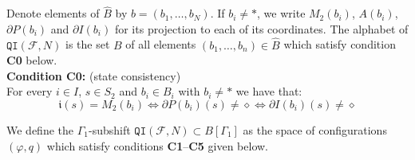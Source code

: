 \documentclass{article}
\theoremstyle{definition}
\theoremstyle{definition}
\newcommand{\Fo}{\mathcal{F}}
\newcommand{\init}{\mathfrak{i}}
\newcommand{\QI}{\mathtt{QI}}
\newcommand{\todo}[1]{\textcolor{red}{\textnormal{TODO: #1}}}
\begin{document}
Denote elements of $\widehat{B}$ by $b = (b_1,\dots,b_N)$. If $b_i \neq \ast$, we write $M_2(b_{i})$, $A(b_{i})$, $\partial P (b_{i})$ and $\partial I(b_{i})$ for its projection to each of its coordinates. The alphabet of $\QI(\Fo,N)$ is the set $B$ of all elements $(b_1,\dots,b_n)\in \widehat{B}$ which satisfy condition \textbf{C0} below.\\
 

\noindent
\textbf{Condition C0:} (state consistency)\\
For every $i \in I$, $s \in S_2$ and $b_i\in B_i$ with $b_i \neq \ast$ we have that:
\[\init(s) = M_2(b_i) \iff \partial P(b_{i})(s)\neq \diamond \iff \partial I(b_{i})(s) \neq \diamond\]

We define the $\Gamma_1$-subshift $\QI(\Fo,N)\subset B[\Gamma_1]$ as the space of configurations $(\varphi,q)$ which satisfy conditions \textbf{C1}--\textbf{C5} given below.\\
\end{document}
